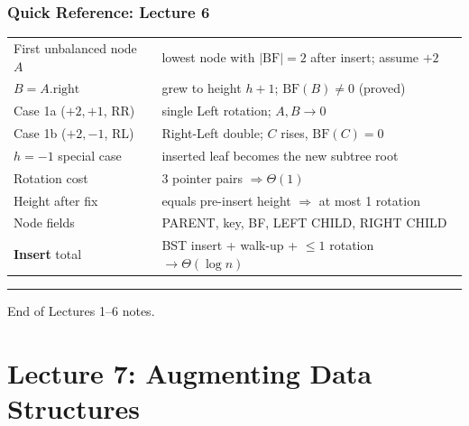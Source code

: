 \documentclass[11pt]{article}
\begin{document}
\section*{\textcolor{violetT}{Quick Reference: Lecture 6}}
\begin{keybox}
\renewcommand{\arraystretch}{1.4}
\begin{tabular}{l l}
First unbalanced node $A$ & lowest node with $|\text{BF}|=2$ after insert; assume $+2$\\
$B = A.\text{right}$ & grew to height $h+1$; $\text{BF}(B)\neq 0$ (proved)\\
Case 1a ($+2,+1$, RR) & single Left rotation; $A,B \to 0$\\
Case 1b ($+2,-1$, RL) & Right-Left double; $C$ rises, $\text{BF}(C)=0$\\
$h=-1$ special case & inserted leaf becomes the new subtree root\\
Rotation cost & 3 pointer pairs $\Rightarrow \Theta(1)$\\
Height after fix & equals pre-insert height $\Rightarrow$ at most 1 rotation\\
Node fields & PARENT, key, BF, LEFT CHILD, RIGHT CHILD\\
\textbf{Insert} total & BST insert + walk-up + $\le 1$ rotation $\to \Theta(\log n)$\\
\end{tabular}
\end{keybox}

\vspace{4pt}

\begin{center}\textcolor{greyline}{\rule{0.5\linewidth}{0.6pt}}\end{center}
\begin{center}\small\textcolor{greyline}{End of Lectures 1--6 notes.}\end{center}


\newpage

\newpage


\part*{\textcolor{utnavy}{Lecture 7: Augmenting Data Structures}}
\setcounter{section}{0}
\end{document}

